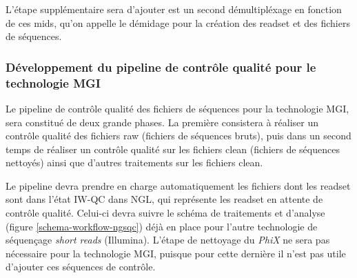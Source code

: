 L'étape supplémentaire sera d'ajouter est un second démultipléxage en fonction de ces mids, qu'on appelle le démidage pour la création des readset et des fichiers de séquences.

\subsubsection{Développement du pipeline de contrôle qualité pour le technologie MGI}
Le pipeline de contrôle qualité des fichiers de séquences pour la technologie MGI, sera constitué de deux grande phases. La première consistera à réaliser un contrôle qualité des fichiers \og raw\fg{} (fichiers de séquences bruts), puis dans un second temps de réaliser un contrôle qualité sur les fichiers \og clean\fg{} (fichiers de séquences nettoyés) ainsi que d'autres traitements sur les fichiers \og clean\fg{}.\\

\newpage

Le pipeline devra prendre en charge automatiquement les fichiers dont les readset sont dans l'état \og IW-QC\fg{} dans NGL, qui représente les readset en attente de contrôle qualité. Celui-ci devra suivre le schéma de traitements et d'analyse (figure \ref{schema-workflow-ngsqc}) déjà en place pour l'autre technologie de séquençage \emph{short reads} (Illumina). L'étape de nettoyage du \emph{PhiX} ne sera pas nécessaire pour la technologie MGI, puisque pour cette dernière il n'est pas utile d'ajouter ces séquences de contrôle.\\

